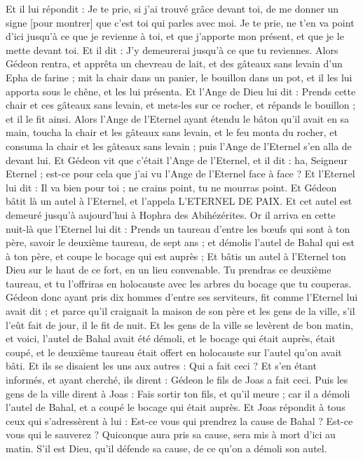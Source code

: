 \begin{multicols}{2}
Et il lui répondit : Je te prie, si j'ai trouvé grâce devant toi, de me donner un signe [pour montrer] que c'est toi qui parles avec moi.
Je te prie, ne t'en va point d'ici jusqu'à ce que je revienne à toi, et que j'apporte mon présent, et que je le mette devant toi. Et il dit : J'y demeurerai jusqu'à ce que tu reviennes.
Alors Gédeon rentra, et apprêta un chevreau de lait, et des gâteaux sans levain d'un Epha de farine ; mit la chair dans un panier, le bouillon dans un pot, et il les lui apporta sous le chêne, et les lui présenta.
Et l'Ange de Dieu lui dit : Prends cette chair et ces gâteaux sans levain, et mets-les sur ce rocher, et répands le bouillon ; et il le fit ainsi.
Alors l'Ange de l'Eternel ayant étendu le bâton qu'il avait en sa main, toucha la chair et les gâteaux sans levain, et le feu monta du rocher, et consuma la chair et les gâteaux sans levain ; puis l'Ange de l'Eternel s'en alla de devant lui.
Et Gédeon vit que c'était l'Ange de l'Eternel, et il dit : ha, Seigneur Eternel ; est-ce pour cela que j'ai vu l'Ange de l'Eternel face à face ?
Et l'Eternel lui dit : Il va bien pour toi ; ne crains point, tu ne mourras point.
Et Gédeon bâtit là un autel à l'Eternel, et l'appela L'ETERNEL DE PAIX. Et cet autel est demeuré jusqu'à aujourd'hui à Hophra des Abihézérites.
Or il arriva en cette nuit-là que l'Eternel lui dit : Prends un taureau d'entre les bœufs qui sont à ton père, savoir le deuxième taureau, de sept ans ; et démolis l'autel de Bahal qui est à ton père, et coupe le bocage qui est auprès ;
Et bâtis un autel à l'Eternel ton Dieu sur le haut de ce fort, en un lieu convenable. Tu prendras ce deuxième taureau, et tu l'offriras en holocauste avec les arbres du bocage que tu couperas.
Gédeon donc ayant pris dix hommes d'entre ses serviteurs, fit comme l'Eternel lui avait dit ; et parce qu'il craignait la maison de son père et les gens de la ville, s'il l'eût fait de jour, il le fit de nuit.
Et les gens de la ville se levèrent de bon matin, et voici, l'autel de Bahal avait été démoli, et le bocage qui était auprès, était coupé, et le deuxième taureau était offert en holocauste sur l'autel qu'on avait bâti.
Et ils se disaient les uns aux autres : Qui a fait ceci ? Et s'en étant informés, et ayant cherché, ils dirent : Gédeon le fils de Joas a fait ceci.
Puis les gens de la ville dirent à Joas : Fais sortir ton fils, et qu'il meure ; car il a démoli l'autel de Bahal, et a coupé le bocage qui était auprès.
Et Joas répondit à tous ceux qui s'adressèrent à lui : Est-ce vous qui prendrez la cause de Bahal ? Est-ce vous qui le sauverez ? Quiconque aura pris sa cause, sera mis à mort d'ici au matin. S'il est Dieu, qu'il défende sa cause, de ce qu'on a démoli son autel.

\end{multicols}
